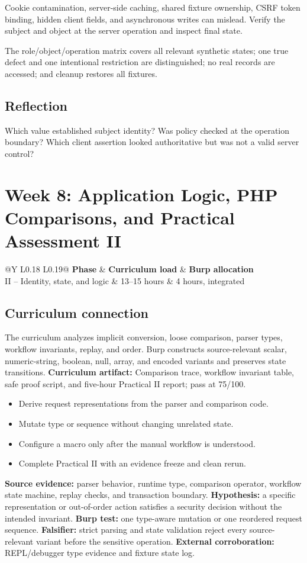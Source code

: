 \documentclass[11pt]{article}
\makeatletter
\newcommand{\weekheader}[5]{%
  \clearpage
  \section{Week #1: #2}
  \begin{tcolorbox}[colback=Navy,colframe=Navy,coltext=white]
    \begin{tabularx}{\linewidth}{@{}Y L{0.18\linewidth} L{0.19\linewidth}@{}}
      \textbf{Phase} & \textbf{Curriculum load} & \textbf{Burp allocation}\\
      #3 & #4 hours & #5 hours, integrated
    \end{tabularx}
  \end{tcolorbox}
}
\newcommand{\weekfield}[2]{%
  \Needspace{5\baselineskip}
  \subsection*{#1}
  #2
}
\newcommand{\curriculumartifact}[1]{\textbf{Curriculum artifact:} #1}
\newcommand{\externalproof}[1]{\textbf{External corroboration:} #1}
\makeatother
\begin{document}
\begin{troubleshootingbox}
Cookie contamination, server-side caching, shared fixture ownership, CSRF token
binding, hidden client fields, and asynchronous writes can mislead. Verify the
subject and object at the server operation and inspect final state.
\end{troubleshootingbox}

\begin{checkpoints}
The role/object/operation matrix covers all relevant synthetic states; one true
defect and one intentional restriction are distinguished; no real records are
accessed; and cleanup restores all fixtures.
\end{checkpoints}

\weekfield{Reflection}{Which value established subject identity? Was policy
checked at the operation boundary? Which client assertion looked authoritative
but was not a valid server control?}

\weekheader{8}{Application Logic, PHP Comparisons, and Practical Assessment II}{II -- Identity, state, and logic}{13--15}{4}

\weekfield{Curriculum connection}{The curriculum analyzes implicit conversion,
loose comparison, parser types, workflow invariants, replay, and order. Burp
constructs source-relevant scalar, numeric-string, boolean, null, array, and
encoded variants and preserves state transitions. \curriculumartifact{Comparison
trace, workflow invariant table, safe proof script, and five-hour Practical II
report; pass at 75/100.}}

\begin{objectivebox}
\begin{itemize}
  \item Derive request representations from the parser and comparison code.
  \item Mutate type or sequence without changing unrelated state.
  \item Configure a macro only after the manual workflow is understood.
  \item Complete Practical II with an evidence freeze and clean rerun.
\end{itemize}
\end{objectivebox}

\begin{bridgebox}
\textbf{Source evidence:} parser behavior, runtime type, comparison operator,
workflow state machine, replay checks, and transaction boundary. \textbf{Hypothesis:}
a specific representation or out-of-order action satisfies a security decision
without the intended invariant. \textbf{Burp test:} one type-aware mutation or
one reordered request sequence. \textbf{Falsifier:} strict parsing and state
validation reject every source-relevant variant before the sensitive operation.
\externalproof{REPL/debugger type evidence and fixture state log.}
\end{bridgebox}
\end{document}
